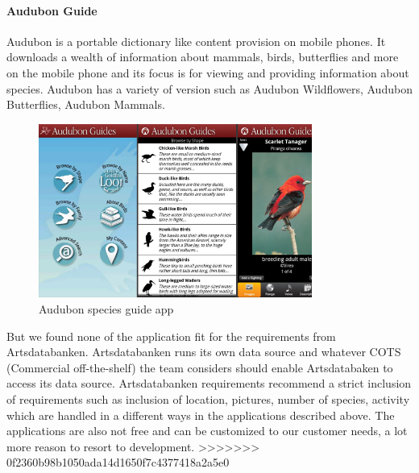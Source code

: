 \paragraph{Audubon Guide}
Audubon is a portable dictionary like content provision on mobile phones. It
downloads a wealth of information about mammals, birds, butterflies and more on
the mobile phone and its focus is for viewing and providing information about
species\cite{similarproduct:audubon}. Audubon has a variety of version such as
Audubon Wildflowers, Audubon Butterflies, Audubon Mammals.

\begin{figure}[htb]
    \centering
    \includegraphics[width=0.8\textwidth]{introduction/project_description/audubonguide.png}
    \caption{Audubon species guide app}
    \label{fig:audubonapp}
\end{figure}

But we found none of the application fit for the requirements from
Artsdatabanken. Artsdatabanken runs its own data source and whatever COTS
(Commercial off-the-shelf) the team considers should enable Artsdatabaken to
access its data source. Artsdatabanken requirements recommend a strict inclusion
of requirements such as inclusion of location, pictures, number of species,
activity which are handled in a different ways in the applications described
above. The applications are also not free and  can be customized to our customer
needs, a lot more reason to resort to development.
>>>>>>> 0f2360b98b1050ada14d1650f7c4377418a2a5e0
